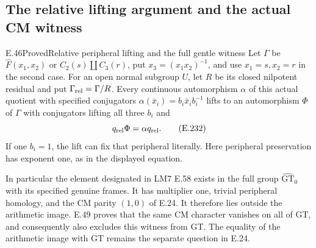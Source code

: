 \subsection{The relative lifting argument and the actual CM witness}

\begin{result}{E.46}{Proved}{Relative peripheral lifting and the full gentle witness}
Let $\Gamma$ be $\widehat F(x_1,x_2)$ or
$C_2(s)\amalg C_3(r)$, put $x_3=(x_1x_2)^{-1}$,
and use $x_1=s,x_2=r$ in the second case.
For an open normal subgroup $U$, let $R$ be its closed
nilpotent residual and put $\Gamma_{\rm rel}=\Gamma/R$.
Every continuous automorphism $\alpha$ of this actual
quotient with specified conjugators
$\alpha(\bar x_i)=b_i\bar x_i b_i^{-1}$ lifts to an
automorphism $\Phi$ of $\Gamma$ with conjugators lifting
all three $b_i$ and
\[
 q_{\rm rel}\Phi=\alpha q_{\rm rel}.
                                                               \tag{E.232}
\]
If one $b_i=1$, the lift can fix that peripheral literally.
Here peripheral preservation has exponent one, as in the
displayed equation.

In particular the element designated in LM7 E.58 exists
in the full group $\widehat{\mathrm{GT}}_0$ with its
specified genuine frames. It has multiplier one, trivial
peripheral homology, and the CM parity $(1,0)$ of E.24.
It therefore lies outside the arithmetic image.
E.49 proves that the same CM character vanishes on
all of GT, and consequently also excludes this
witness from GT. The equality of the arithmetic
image with GT remains the separate question in E.24.
\end{result}
